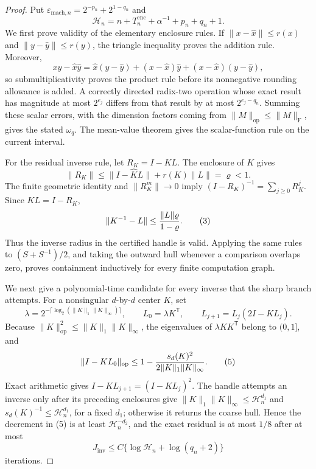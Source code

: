 \documentclass{article}
\begin{document}
\begin{proof}
Put \(\varepsilon_{
\mathrm{mach},n}=2^{-p_n}+2^{1-q_n}\) and
\[
\mathcal H_n=n+T_n^{\mathrm{enc}}+\alpha^{-1}+p_n+q_n+1.
\]
We first prove validity of the elementary enclosure rules.  If
\(\|x-\widehat x\|\le r(x)\) and \(\|y-\widehat y\|\le r(y)\), the triangle
inequality proves the addition rule.  Moreover,
\[
xy-\widehat x\widehat y
=\widehat x(y-\widehat y)+(x-\widehat x)\widehat y
+(x-\widehat x)(y-\widehat y),                                      \tag{1}
\]
so submultiplicativity proves the product rule before its nonnegative rounding
allowance is added.  A correctly directed radix-two operation whose exact result
has magnitude at most \(2^{e_j}\) differs from that result by at most
\(2^{e_j-q_n}\).  Summing these scalar errors, with the dimension factors coming
from \(\|M\|_{\mathrm{op}}\le\|M\|_{\mathrm F}\), gives the stated
\(\omega_q\).  The mean-value theorem gives the scalar-function rule on the
current interval.

For the residual inverse rule, let \(R_K=I-KL\).  The enclosure of \(K\) gives
\[
\|R_K\|\le \|I-\widehat K L\|+r(K)\|L\|=\varrho<1.                 \tag{2}
\]
The finite geometric identity and \(\|R_K^m\|\to0\) imply
\((I-R_K)^{-1}=\sum_{j\ge0}R_K^j\).  Since \(KL=I-R_K\),
\[
\|K^{-1}-L\|
\le {\|L\|\varrho\over1-\varrho}.                                  \tag{3}
\]
Thus the inverse radius in the certified handle is valid.  Applying the same
rules to \((S+S^{-1})/2\), and taking the outward hull whenever a comparison
overlaps zero, proves containment inductively for every finite computation graph.

We next give a polynomial-time candidate for every inverse that the sharp branch
attempts.  For a nonsingular \(d\)-by-\(d\) center \(K\), set
\[
\lambda=2^{-\lceil\log_2(\|K\|_1\|K\|_\infty)\rceil},\qquad
L_0=\lambda K^{\mathsf T},\qquad
L_{j+1}=L_j(2I-KL_j).                                                \tag{4}
\]
Because \(\|K\|_{\mathrm{op}}^2\le\|K\|_1\|K\|_\infty\), the eigenvalues
of \(\lambda KK^{\mathsf T}\) belong to \((0,1]\), and
\[
\|I-KL_0\|_{
\mathrm{op}}
\le1-{s_d(K)^2\over2\|K\|_1\|K\|_\infty}.                         \tag{5}
\]
Exact arithmetic gives \(I-KL_{j+1}=(I-KL_j)^2\).  The handle attempts an
inverse only after its preceding enclosures give
\(\|K\|_1\|K\|_\infty\le\mathcal H_n^{d_1}\) and
\(s_d(K)^{-1}\le\mathcal H_n^{d_1}\), for a fixed \(d_1\); otherwise it
returns the coarse hull.  Hence the decrement in (5) is at least
\(\mathcal H_n^{-d_2}\), and the exact residual is at most \(1/8\) after at
most
\[
J_{
\mathrm{inv}}\le C\{\log\mathcal H_n+\log(q_n+2)\}                \tag{6}
\]
iterations.


\end{proof}
\end{document}
